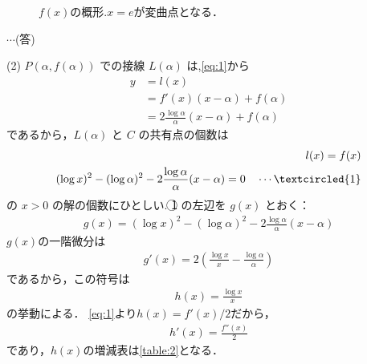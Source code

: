 \documentclass[a4paper,10pt]{ltjsarticle}
\begin{document}
\begin{multicols}{2}
\begin{figure}[H]
    \caption{$f(x)$の概形.$x=e$が変曲点となる．}
    \label{fig:1}
  \end{figure}

  $\cdots$(答)

  \vspace{10pt}
  (2)
  $P(\alpha, f(\alpha))$ での接線 $L(\alpha)$ は,\cref{eq:1}から
  \begin{align*}
    y
     & = l(x)                                               \\
     & = f'(x) (x - \alpha) + f(\alpha)                     \\
     & = 2\frac{\log \alpha}{\alpha} (x-\alpha) + f(\alpha)
  \end{align*}
  であるから，$L(\alpha)$ と $C$ の共有点の個数は
  \begin{align*}
    l(x) = f(x) \\
    (\log x)^2 - (\log \alpha)^2 - 2\frac{\log \alpha}{\alpha} (x-\alpha) = 0 \quad \cdots \textcircled{1}
  \end{align*}
  の $x>0$ の解の個数にひとしい.
  \textcircled{1} の左辺を $g(x)$ とおく：
  \begin{align*}
    g(x) = (\log x)^2 - (\log \alpha)^2 - 2\frac{\log \alpha}{\alpha} (x-\alpha)
  \end{align*}
  $g(x)$の一階微分は
  \begin{align*}
    g'(x) = 2 \left( \frac{\log x}{x} - \frac{\log \alpha}{\alpha} \right)
  \end{align*}
  であるから，この符号は
  \begin{align*}
    h(x) = \frac{\log x}{x}
  \end{align*}
  の挙動による．
  \cref{eq:1}より$h(x) = f'(x)/2$だから，
  \begin{align*}
    h'(x) = \frac{f''(x)}{2}
  \end{align*}
  であり，$h(x)$の増減表は\cref{table:2}となる．
  \begin{table}[H]
    \centering

\end{table}
\end{multicols}
\end{document}
